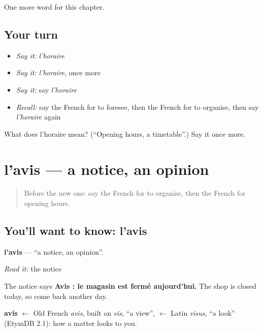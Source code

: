 \begin{grammarlens}[title={What you've built}]
One more word for this chapter.
\end{grammarlens}

\subsection*{Your turn}
\begin{itemize}
\raggedright
  \item \emph{Say it:} \emph{l'horaire}
  \item \emph{Say it:} \emph{l'horaire}, once more
  \item \emph{Say it:} say \emph{l'horaire}
  \item \emph{Recall:} say the French for to foresee, then the French for to organise, then say \emph{l'horaire} again
\end{itemize}

\begin{tcolorbox}[breakable,colback=teal!4,colframe=teal!35!black,title={Before you move on}]
What does l'horaire mean? (\textquotedblleft{}Opening hours, a timetable\textquotedblright{}.) Say it once more.
\end{tcolorbox}
\section[l'avis]{l'avis — a notice, an opinion}

\label{lesson:FR-C142-lavis}



\begin{quote}
Before the new one: say the French for to organise, then the French for opening hours.
\end{quote}

\subsection*{You'll want to know: l'avis}
\textbf{l'avis} — \textquotedblleft{}a notice, an opinion\textquotedblright{}.

\emph{Read it:} the notice

The notice says \textbf{Avis : le magasin est fermé aujourd'hui.} The shop is closed today, so come back another day.

\begin{cousinweb}
\textbf{avis} $\leftarrow$ Old French \emph{avis}, built on \emph{vis}, \textquotedblleft{}a view\textquotedblright{}, $\leftarrow$ Latin \emph{visus}, \textquotedblleft{}a look\textquotedblright{} (EtymDB 2.1): how a matter looks to you.
\end{cousinweb}


